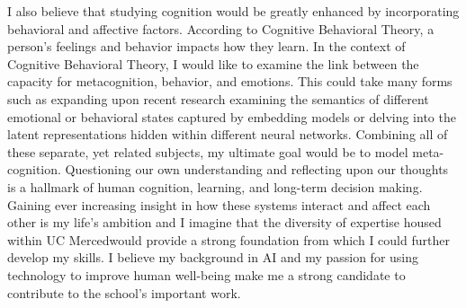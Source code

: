 \documentclass[12pt]{article}
\newcommand{\school}{UC Merced}
\begin{document}
I also believe that studying cognition would be greatly enhanced by incorporating behavioral and affective factors.  According to
Cognitive Behavioral Theory, a person's feelings and behavior impacts how they learn.  In the context of Cognitive Behavioral Theory, I would
like to examine the link between the capacity for metacognition, behavior, and emotions.  This could take many forms such as expanding upon
recent research examining the semantics of different emotional or behavioral states captured by embedding models or delving into the latent
representations hidden within different neural networks.  Combining all of these separate, yet related subjects, my ultimate goal would be
to model meta-cognition.  Questioning our own understanding and reflecting upon our thoughts is a hallmark of human cognition, learning, and
long-term decision making.  Gaining ever increasing insight in how these systems interact and affect each other is my life's ambition and I
imagine that the diversity of expertise housed within \school would provide a strong foundation from which I could further develop my
skills. I believe my background in AI and my passion for using technology to improve human well-being make me a strong candidate to
contribute to the school's important work.
\end{document}
